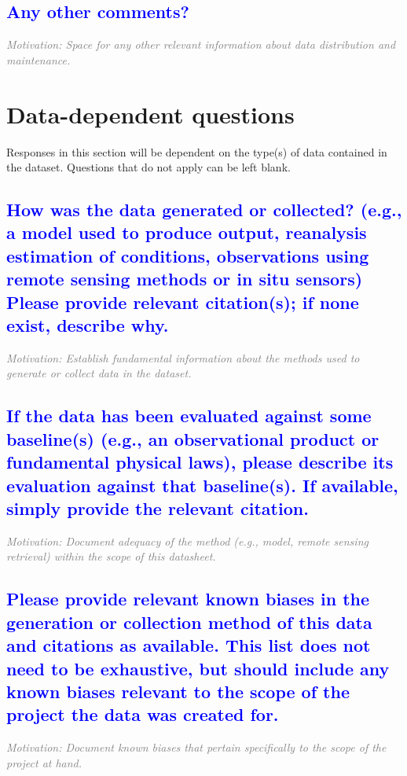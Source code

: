 \documentclass[letterpaper, 10 pt, transmag]{IEEEtran}
\begin{document}
\textcolor{blue}{\subsection{Any other comments?}}
\textcolor{gray}{\textit{Motivation: Space for any other relevant information about data distribution and maintenance.}}
\vspace{10mm}

\section{Data-dependent questions}
Responses in this section will be dependent on the type(s) of data contained in the dataset. Questions that do not apply can be left blank.


\textcolor{blue}{\subsection{How was the data generated or collected? (e.g., a model used to produce output, reanalysis estimation of conditions, observations using remote sensing methods or in situ sensors) Please provide relevant citation(s); if none exist, describe why.}}
\textcolor{gray}{\textit{Motivation: Establish fundamental information about the methods used to generate or collect data in the dataset.}}

\textcolor{blue}{\subsection{If the data has been evaluated against some baseline(s) (e.g., an observational product or fundamental physical laws), please describe its evaluation against that baseline(s). If available, simply provide the relevant citation.}}
\textcolor{gray}{\textit{Motivation: Document adequacy of the method (e.g., model, remote sensing retrieval) within the scope of this datasheet.}}

\textcolor{blue}{\subsection{Please provide relevant known biases in the generation or collection method of this data and citations as available. This list does not need to be exhaustive, but should include any known biases relevant to the scope of the project the data was created for.}}
\textcolor{gray}{\textit{Motivation: Document known biases that pertain specifically to the scope of the project at hand.}}
\end{document}
